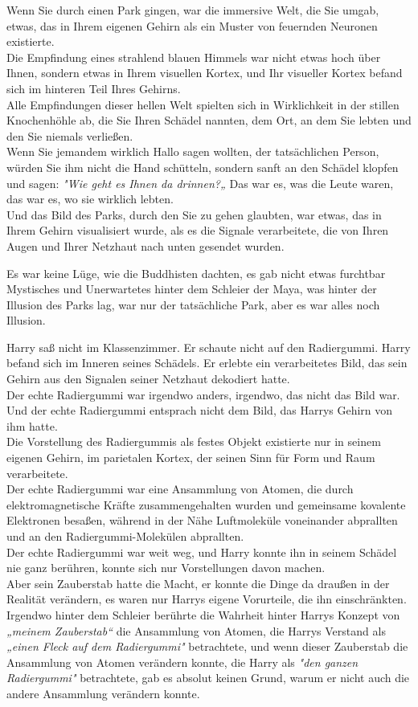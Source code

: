 {Wenn Sie durch einen Park gingen, war die immersive Welt, die Sie umgab, etwas, das in Ihrem eigenen Gehirn als ein Muster von feuernden Neuronen existierte.\\ Die Empfindung eines strahlend blauen Himmels war nicht etwas hoch über Ihnen, sondern etwas in Ihrem visuellen Kortex, und Ihr visueller Kortex befand sich im hinteren Teil Ihres Gehirns.\\ Alle Empfindungen dieser hellen Welt spielten sich in Wirklichkeit in der stillen Knochenhöhle ab, die Sie Ihren Schädel nannten, dem Ort, an dem Sie lebten und den Sie niemals verließen.\\ Wenn Sie jemandem wirklich Hallo sagen wollten, der tatsächlichen Person, würden Sie ihm nicht die Hand schütteln, sondern sanft an den Schädel klopfen und sagen: \emph{"Wie geht es Ihnen da drinnen?„} Das war es, was die Leute waren, das war es, wo sie wirklich lebten.\\ Und das Bild des Parks, durch den Sie zu gehen glaubten, war etwas, das in Ihrem Gehirn visualisiert wurde, als es die Signale verarbeitete, die von Ihren Augen und Ihrer Netzhaut nach unten gesendet wurden.

Es war keine Lüge, wie die Buddhisten dachten, es gab nicht etwas furchtbar Mystisches und Unerwartetes hinter dem Schleier der Maya, was hinter der Illusion des Parks lag, war nur der tatsächliche Park, aber es war alles noch Illusion.

Harry saß nicht im Klassenzimmer. Er schaute nicht auf den Radiergummi. Harry befand sich im Inneren seines Schädels. Er erlebte ein verarbeitetes Bild, das sein Gehirn aus den Signalen seiner Netzhaut dekodiert hatte.\\ Der echte Radiergummi war irgendwo anders, irgendwo, das nicht das Bild war. Und der echte Radiergummi entsprach nicht dem Bild, das Harrys Gehirn von ihm hatte.\\ Die Vorstellung des Radiergummis als festes Objekt existierte nur in seinem eigenen Gehirn, im parietalen Kortex, der seinen Sinn für Form und Raum verarbeitete.\\ Der echte Radiergummi war eine Ansammlung von Atomen, die durch elektromagnetische Kräfte zusammengehalten wurden und gemeinsame kovalente Elektronen besaßen, während in der Nähe Luftmoleküle voneinander abprallten und an den Radiergummi-Molekülen abprallten.\\ Der echte Radiergummi war weit weg, und Harry konnte ihn in seinem Schädel nie ganz berühren, konnte sich nur Vorstellungen davon machen.\\ Aber sein Zauberstab hatte die Macht, er konnte die Dinge da draußen in der Realität verändern, es waren nur Harrys eigene Vorurteile, die ihn einschränkten.\\ Irgendwo hinter dem Schleier berührte die Wahrheit hinter Harrys Konzept von\\ \emph{„meinem Zauberstab“} die Ansammlung von Atomen, die Harrys Verstand als \emph{„einen Fleck auf dem Radiergummi"} betrachtete, und wenn dieser Zauberstab die Ansammlung von Atomen verändern konnte, die Harry als \emph{"den ganzen Radiergummi"} betrachtete, gab es absolut keinen Grund, warum er nicht auch die andere Ansammlung verändern konnte.

}
